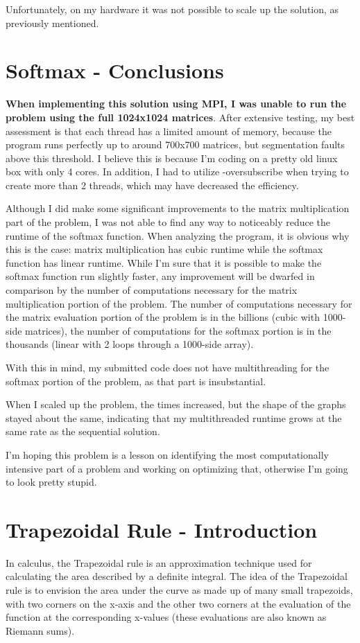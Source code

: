 \documentclass[a4paper]{article}
\begin{document}
\noindent
Unfortunately, on my hardware it was not possible to scale up the solution, as previously mentioned.


\section{Softmax - Conclusions}
\textbf{When implementing this solution using MPI, I was unable to run the problem using the full 1024x1024 matrices}. After extensive testing, my best assessment is that each thread has a limited amount of memory, because the program runs perfectly up to around 700x700 matrices, but segmentation faults above this threshold. I believe this is because I'm coding on a pretty old linux box with only 4 cores. In addition, I had to utilize -oversubscribe when trying to create more than 2 threads, which may have decreased the efficiency.

Although I did make some significant improvements to the matrix multiplication part of the problem, I was not able to find any way to noticeably reduce the runtime of the softmax function. When analyzing the program, it is obvious why this is the case: matrix multiplication has cubic runtime while the softmax function has linear runtime. While I'm sure that it is possible to make the softmax function run slightly faster, any improvement will be dwarfed in comparison by the number of computations necessary for the matrix multiplication portion of the problem. The number of computations necessary for the matrix evaluation portion of the problem is in the billions (cubic with 1000-side matrices), the number of computations for the softmax portion is in the thousands (linear with 2 loops through a 1000-side array).

With this in mind, my submitted code does not have multithreading for the softmax portion of the problem, as that part is insubstantial.

When I scaled up the problem, the times increased, but the shape of the graphs stayed about the same, indicating that my multithreaded runtime grows at the same rate as the sequential solution.

I'm hoping this problem is a lesson on identifying the most computationally intensive part of a problem and working on optimizing that, otherwise I'm going to look pretty stupid.

\section{Trapezoidal Rule - Introduction}
In calculus, the Trapezoidal rule is an approximation technique used for calculating the area described by a definite integral. The idea of the Trapezoidal rule is to envision the area under the curve as made up of many small trapezoids, with two corners on the x-axis and the other two corners at the evaluation of the function at the corresponding x-values (these evaluations are also known as Riemann sums). 
\end{document}

